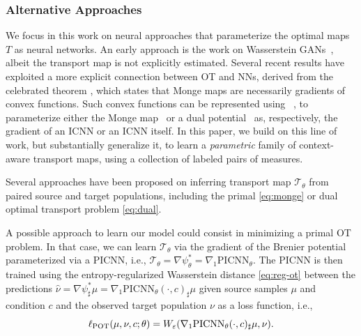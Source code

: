 \subsubsection{Alternative Approaches}  We focus in this work on neural approaches that parameterize the optimal maps $T$ as neural networks. An early approach is the work on Wasserstein GANs~\citep{arjovsky2017wasserstein}, albeit the transport map is not explicitly estimated. 
Several recent results have exploited a more explicit connection between OT and NNs, derived from the celebrated \citeauthor{brenier1987decomposition} theorem \citeyearpar{brenier1987decomposition}, which states that Monge maps are necessarily gradients of convex functions.
Such convex functions can be represented using ~\citep{amos2017input}, to parameterize either the Monge map~\citep{korotin2021wasserstein,yang2018scalable,bunne2021learning,bunne2022proximal} or a dual potential~\citep{makkuva2020optimal,korotin2021wasserstein} as, respectively, the gradient of an \acrshort{ICNN} or an \acrshort{ICNN} itself.
In this paper, we build on this line of work, but substantially generalize it, to learn a {\em parametric} family of context-aware transport maps, using a collection of labeled pairs of measures.

Several approaches have been proposed on inferring transport map $\mathcal{T}_{\theta}$ from paired source and target populations, including the primal \eqref{eq:monge} or dual optimal transport problem \eqref{eq:dual}.

A possible approach to learn our model could consist in minimizing a primal OT problem. In that case, we can learn $\mathcal{T}_{\theta}$ via the gradient of the Brenier potential parameterized via a PICNN, i.e., $\mathcal{T}_{\theta} = \nabla \psi_\theta^* = \nabla_1 \text{PICNN}_\theta$.
The PICNN is then trained using the entropy-regularized Wasserstein distance \eqref{eq:reg-ot} between the predictions $\hat{\nu} = \nabla \psi^* _\sharp \mu = \nabla_1 \text{PICNN}_\theta (\cdot, c)_\sharp \mu$ given source samples $\mu$ and condition $c$ and the observed target population $\nu$ as a loss function, i.e.,
\begin{equation} \label{eq:pot_loss}
    \ell_\text{POT}(\mu, \nu, c; \theta) = W_{\varepsilon}(\nabla_1 \text{PICNN}_\theta (\cdot, c)_\sharp\mu,\nu).
\end{equation}

